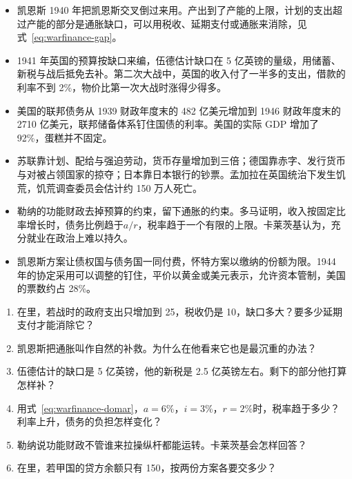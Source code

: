 \begin{takeaways}
\begin{itemize}
\item 凯恩斯 1940 年把凯恩斯交叉倒过来用。产出到了产能的上限，计划的支出超过产能的部分是通胀缺口，可以用税收、延期支付或通胀来消除，见式~\eqref{eq:warfinance-gap}。
\item 1941 年英国的预算按缺口来编，伍德估计缺口在 5 亿英镑的量级，用储蓄、新税与战后抵免去补。第二次大战中，英国的收入付了一半多的支出，借款的利率不到 2\%，物价比第一次大战时涨得少得多。
\item 美国的联邦债务从 1939 财政年度末的 482 亿美元增加到 1946 财政年度末的 2710 亿美元，联邦储备体系钉住国债的利率。美国的实际 GDP 增加了 92\%，蛋糕并不固定。
\item 苏联靠计划、配给与强迫劳动，货币存量增加到三倍；德国靠赤字、发行货币与对被占领国家的掠夺；日本靠日本银行的钞票。孟加拉在英国统治下发生饥荒，饥荒调查委员会估计约 150 万人死亡。
\item 勒纳的功能财政去掉预算的约束，留下通胀的约束。多马证明，收入按固定比率增长时，债务比例趋于$a/r$，税率趋于一个有限的上限。卡莱茨基认为，充分就业在政治上难以持久。
\item 凯恩斯方案让债权国与债务国一同付费，怀特方案以缴纳的份额为限。1944 年的协定采用可以调整的钉住，平价以黄金或美元表示，允许资本管制，美国的票数约占 28\%。
\end{itemize}
\end{takeaways}

\begin{selfcheck}
\begin{enumerate}
\item 在里，若战时的政府支出只增加到 25，税收仍是 10，缺口多大？要多少延期支付才能消除它？
\item 凯恩斯把通胀叫作自然的补救。为什么在他看来它也是最沉重的办法？
\item 伍德估计的缺口是 5 亿英镑，他的新税是 2.5 亿英镑左右。剩下的部分他打算怎样补？
\item 用式~\eqref{eq:warfinance-domar}，$a=6\%$，$i=3\%$，$r=2\%$时，税率趋于多少？利率上升，债务的负担怎样变化？
\item 勒纳说功能财政不管谁来拉操纵杆都能运转。卡莱茨基会怎样回答？
\item 在里，若甲国的贷方余额只有 150，按两份方案各要交多少？
\end{enumerate}
\end{selfcheck}

